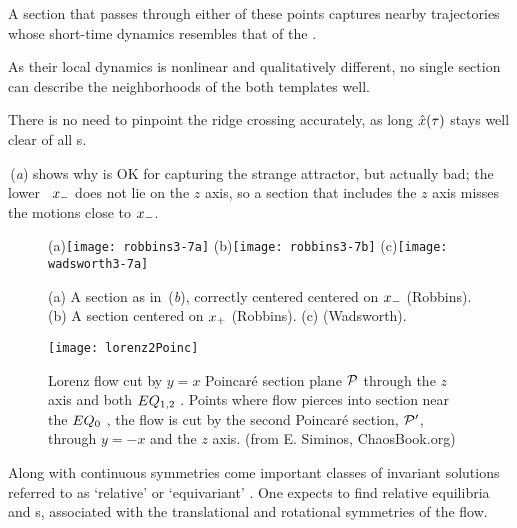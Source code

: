  A
section that passes through either of these points captures nearby
trajectories whose short-time dynamics resembles that of the \template.

 As their local
dynamics is nonlinear and qualitatively different, no single section can
describe the neighborhoods of the both templates well.

There is
no need to pinpoint the ridge crossing accurately, as long $\hat{x}(\tau)$
stays well clear of all \chartBord s.

\,({\it a}) shows why  is OK for
capturing the strange attractor, but actually bad; the lower \eqv\
$x_{-}$ does not lie on the $z$ axis, so a section that includes the
$z$ axis misses the motions close to  $x_{-}$.

\begin{figure}
   \centering
(a)\texttt{[image: robbins3-7a]}
(b)\texttt{[image: robbins3-7b]}
(c)\texttt{[image: wadsworth3-7a]}
   \caption{\label{fig:robbins3-7}
    (a)
A section as in \,({\it b}), correctly centered
centered on $x_{-}$ (Robbins).
    (b)
A section centered on $x_{+}$ (Robbins).
    (c)
(Wadsworth).
}
\end{figure}

\begin{figure}
   \centering
\texttt{[image: lorenz2Poinc]}
   \caption{
Lorenz flow cut by  $y=x$ Poincar\'e section plane ${\cal P}$ through the
$z$ axis and both $EQ_{1,2}$ \eqva. Points where flow pierces into
section %
near the $EQ_{0}$ \eqv, the flow is cut by the second Poincar\'e
section,  ${\cal P}'$, through $y=-x$ and the $z$ axis.
\hfill (from E. Siminos, ChaosBook.org)
} \label{fig:LorenzSect}
\end{figure}


Along with continuous symmetries come important classes of invariant
solutions referred to as `relative' or `equivariant'
. One expects to find relative
equilibria and \rpo s, associated with the translational
and rotational symmetries of the flow.

